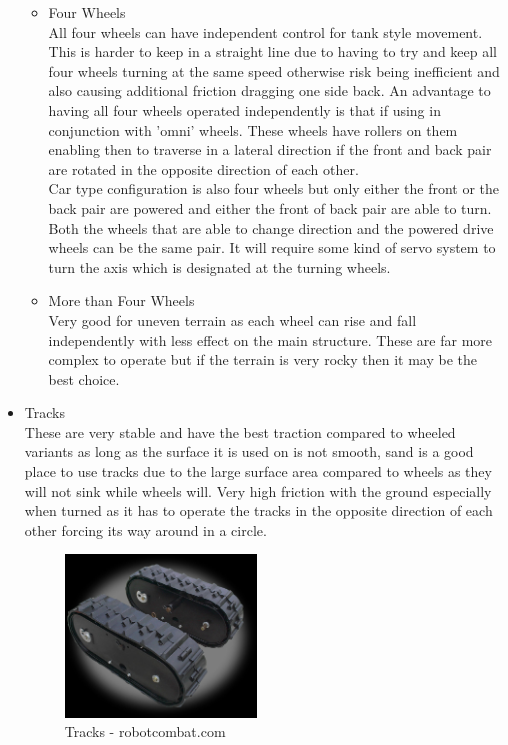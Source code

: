 \begin{itemize}
\begin{itemize}
	\item Four Wheels
	\\All four wheels can have independent control for tank style movement.  This is harder to keep in a straight line due to having to try and keep all four wheels turning at the same speed otherwise risk being inefficient and also causing additional friction dragging one side back.  An advantage to having all four wheels operated independently is that if using in conjunction with 'omni' wheels.  These wheels have rollers on them enabling then to traverse in a lateral direction if the front and back pair are rotated in the opposite direction of each other.
	\\Car type configuration is also four wheels but only either the front or the back pair are powered and either the front of back pair are able to turn.  Both the wheels that are able to change direction and the powered drive wheels can be the same pair.  It will require some kind of servo system to turn the axis which is designated at the turning wheels.

	\item More than Four Wheels
	\\Very good for uneven terrain as each wheel can rise and fall independently with less effect on the main structure.  These are far more complex to operate but if the terrain is very rocky then it may be the best choice.
	\end{itemize}

\item Tracks
\\These are very stable and have the best traction compared to wheeled variants as long as the surface it is used on is not smooth, sand is a good place to use tracks due to the large surface area compared to wheels as they will not sink while wheels will.  Very high friction with the ground especially when turned as it has to operate the tracks in the opposite direction of each other forcing its way around in a circle.
\begin{figure}[H]
\centering
        \includegraphics[width=2.0in] {Images/wheel-track.jpg}
        \caption{Tracks - robotcombat.com}
        \label{Tracks}
\end{figure}



\end{itemize}
